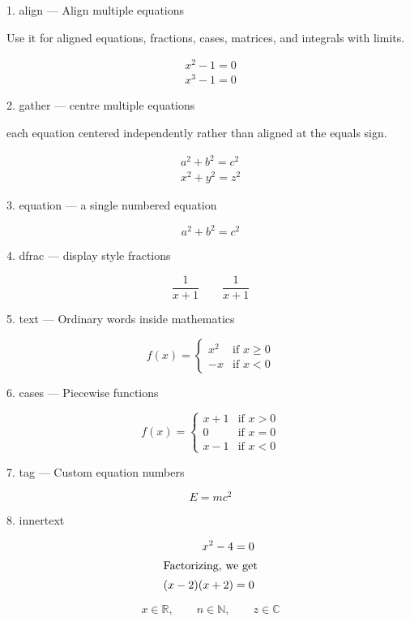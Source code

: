 \documentclass{article}
\begin{document}
1. align --- Align multiple equations

Use it for aligned equations, fractions, cases, matrices, and integrals with limits.

\begin{align}
    x^2 -1 = 0\\
    x^3 - 1 = 0
\end{align}

2. gather --- centre multiple equations

each equation centered independently rather than aligned at the equals sign.

\begin{gather*}
    a^2+b^2=c^2\\
    x^2+y^2=z^2
\end{gather*}

3. equation --- a single numbered equation

\begin{equation}
a^2+b^2=c^2
\end{equation}

4. dfrac --- display style fractions

\[
\frac{1}{x+1}
\qquad
\dfrac{1}{x+1}
\]

5. text --- Ordinary words inside mathematics

\[
f(x)=
\begin{cases}
x^2 & \text{if } x\geq 0\\
-x  & \text{if } x<0
\end{cases}
\]

6. cases --- Piecewise functions

\[
f(x)= 
\begin{cases}
    x+1 & \text{if } x > 0\\
    0 & \text{if } x = 0\\
    x-1 & \text{if } x < 0
\end{cases}
\]

7. tag --- Custom equation numbers

\begin{equation*}
E=mc^2 \tag{1.1}
\end{equation*}

8. innertext 

\begin{align*}
x^2-4 &= 0\\
\intertext{Factorizing, we get}
(x-2)(x+2) &= 0
\end{align*}


\pagebreak

\[
x \in \mathbb{R}, \qquad
n \in \mathbb{N}, \qquad
z \in \mathbb{C}
\]
\end{document}

